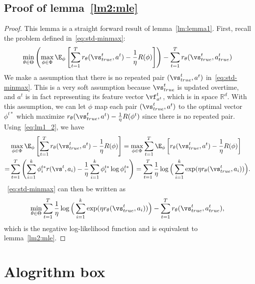 \documentclass{article} %
\begin{document}
\subsection{Proof of lemma~\ref{lm2:mle}}
\secondlemma*
\begin{proof}This lemma is a straight forward result of lemma~\ref{lm:lemma1}.
First, recall the problem defined in~\eqref{eq:std-minmax}:
\[
\min_{\theta \in \Theta} \left(\max_{\phi\in \Phi}  \E_{\phi} \left[\sum_{t=1}^Tr_{\theta}(\vs^t_{true}, a^t) -\frac{1}{\eta}R(\phi)\right]\right)-\sum_{t=1}^T r_{\theta}(\vs^t_{true}, a^t_{true})
	\]
We make a assumption that there is no repeated pair $(\vs^t_{true}, a^t)$ in~\eqref{eq:std-minmax}. This is a very soft assumption because $\vs^t_{true}$ is updated overtime, and $a^t$ is in fact representing its feature vector $\vf^t_{a^t}$, which is in space $\mathbb{R}^d$. With this assumption, we can let $\phi$ map each pair $(\vs^t_{true}, a^t)$ to the optimal vector $\phi^{t*}$  which maximize $r_{\theta}(\vs^t_{true}, a^t) -\frac{1}{\eta}R(\phi^t)$ since there is no repeated pair. Using~\eqref{eq:lm1_2}, we have
\begin{align*}
&\max_{\phi\in \Phi}  \E_{\phi} \left[\sum_{t=1}^Tr_{\theta}(\vs^t_{true}, a^t) -\frac{1}{\eta}R(\phi)\right] = \max_{\phi\in \Phi} \sum_{t=1}^T \E_{\phi} \left[r_{\theta}(\vs^t_{true}, a^t) -\frac{1}{\eta}R(\phi)\right] \\
    =& \sum_{t=1}^T\left(   \sum_{i=1}^k \phi_i^{t*}r(\vs^t, a_i) -\frac{1}{\eta} \sum_{i=1}^k \phi_i^{t*} \log \phi_i^{t*} \right)=\sum_{t=1}^T\frac{1}{\eta}\log\Big(\sum_{i=1}^k \exp(\eta r_{\theta}(\vs^t_{true}, a_i))\Big).
\end{align*}~\eqref{eq:std-minmax} can then be written as
\[
\min_{\theta\in\Theta}\sum_{t=1}^T\frac{1}{\eta}\log\Big(\sum_{i=1}^k \exp(\eta r_{\theta}(\vs^t_{true}, a_i))\Big) - \sum_{t=1}^T r_{\theta}(\vs^t_{true}, a^t_{true}),
\]
which is the negative log-likelihood function and is equivalent to lemma~\ref{lm2:mle}.
\end{proof}

\section{Alogrithm box}\label{app:algo}
\end{document}
